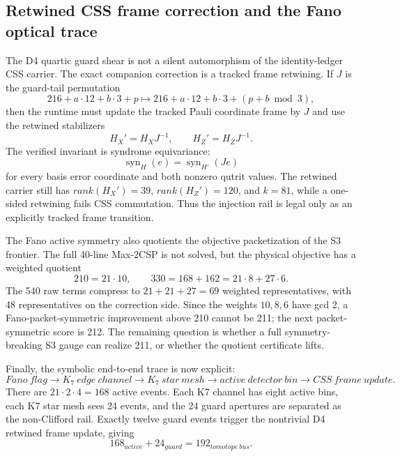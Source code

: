 \subsection{Retwined CSS frame correction and the Fano optical trace}
\label{sec:bt1425-bt1427-retwined-fano-pipeline}

The D4 quartic guard shear is not a silent automorphism of the identity-ledger
CSS carrier.  The exact companion correction is a tracked frame retwining.  If
\(J\) is the guard-tail permutation
\[
216+a\cdot12+b\cdot3+p
\longmapsto
216+a\cdot12+b\cdot3+(p+b\bmod3),
\]
then the runtime must update the tracked Pauli coordinate frame by \(J\) and
use the retwined stabilizers
\[
H_X'=H_XJ^{-1},
\qquad
H_Z'=H_ZJ^{-1}.
\]
The verified invariant is syndrome equivariance:
\[
\operatorname{syn}_{H}(e)=\operatorname{syn}_{H'}(Je)
\]
for every basis error coordinate and both nonzero qutrit values.  The retwined
carrier still has \(rank(H_X')=39\), \(rank(H_Z')=120\), and \(k=81\), while a
one-sided retwining fails CSS commutation.  Thus the injection rail is legal
only as an explicitly tracked frame transition.

The Fano active symmetry also quotients the objective packetization of the S3
frontier.  The full 40-line Max-2CSP is not solved, but the physical objective
has a weighted quotient
\[
210=21\cdot10,
\qquad
330=168+162=21\cdot8+27\cdot6.
\]
The 540 raw terms compress to \(21+21+27=69\) weighted representatives, with
48 representatives on the correction side.  Since the weights \(10,8,6\) have
gcd 2, a Fano-packet-symmetric improvement above 210 cannot be 211; the next
packet-symmetric score is 212.  The remaining question is whether a full
symmetry-breaking S3 gauge can realize 211, or whether the quotient certificate
lifts.

Finally, the symbolic end-to-end trace is now explicit:
\[
Fano\ flag \to K_7\ edge\ channel \to K_7\ star\ mesh
\to active\ detector\ bin \to CSS\ frame\ update.
\]
There are \(21\cdot2\cdot4=168\) active events.  Each K7 channel has eight
active bins, each K7 star mesh sees 24 events, and the 24 guard apertures are
separated as the non-Clifford rail.  Exactly twelve guard events trigger the
nontrivial D4 retwined frame update, giving
\[
168_{active}+24_{guard}=192_{tomotope\ bus}.
\]
